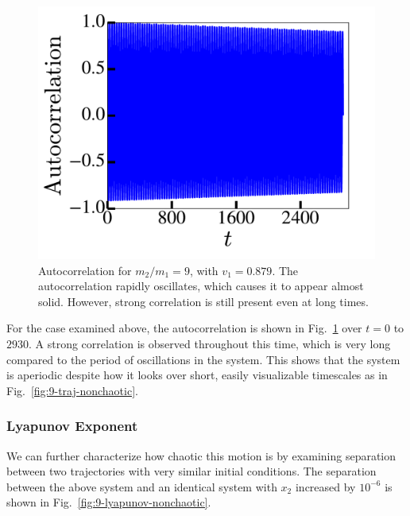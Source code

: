 \documentclass[pra,twocolumn,showpacs,amsmath,amssymb, aps, 10pt]{revtex4-1}
\begin{document}
\begin{figure}
  \includegraphics[width=0.8\linewidth]{nonchaotic_r0_1_acorr}
  \caption{Autocorrelation for $m_2/m_1 = 9$, with $v_1=0.879$. The autocorrelation
  rapidly oscillates, which causes it to appear almost solid. However, strong
  correlation is still present even at long times.}
  \label{fig:9-acorr-nonchaotic}
\end{figure}

For the case examined above, the autocorrelation is shown in Fig.~\ref{fig:9-acorr-nonchaotic}
over $t=0$ to $2930$. A strong correlation is observed throughout this time,
which is very long compared to the period of oscillations in the system. This
shows that the system is aperiodic despite how it looks over short, easily
visualizable timescales as in Fig.~\ref{fig:9-traj-nonchaotic}.


\subsubsection{Lyapunov Exponent}

We can further characterize how chaotic this motion is by examining separation
between two trajectories with very similar initial conditions. The separation
between the above system and an identical system with $x_2$ increased by $10^{-6}$
is shown in Fig.~\ref{fig:9-lyapunov-nonchaotic}.
\end{document}
